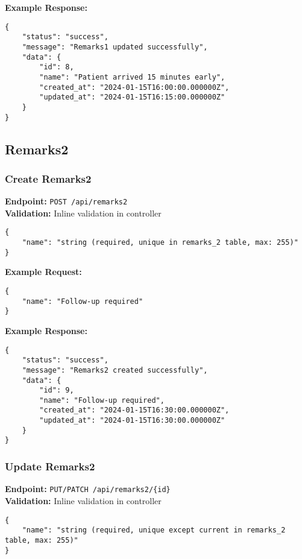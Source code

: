 \documentclass[12pt,a4paper]{article}
\begin{document}
\textbf{Example Response:}
\begin{lstlisting}[caption=Update Remarks1 Example Response]
{
    "status": "success",
    "message": "Remarks1 updated successfully",
    "data": {
        "id": 8,
        "name": "Patient arrived 15 minutes early",
        "created_at": "2024-01-15T16:00:00.000000Z",
        "updated_at": "2024-01-15T16:15:00.000000Z"
    }
}
\end{lstlisting}

\subsection{Remarks2}

\subsubsection{Create Remarks2}
\textbf{Endpoint:} \texttt{POST /api/remarks2}\\
\textbf{Validation:} Inline validation in controller

\begin{lstlisting}[caption=Create Remarks2 Request Body]
{
    "name": "string (required, unique in remarks_2 table, max: 255)"
}
\end{lstlisting}

\textbf{Example Request:}
\begin{lstlisting}[caption=Create Remarks2 Example Request]
{
    "name": "Follow-up required"
}
\end{lstlisting}

\textbf{Example Response:}
\begin{lstlisting}[caption=Create Remarks2 Example Response]
{
    "status": "success",
    "message": "Remarks2 created successfully",
    "data": {
        "id": 9,
        "name": "Follow-up required",
        "created_at": "2024-01-15T16:30:00.000000Z",
        "updated_at": "2024-01-15T16:30:00.000000Z"
    }
}
\end{lstlisting}

\subsubsection{Update Remarks2}
\textbf{Endpoint:} \texttt{PUT/PATCH /api/remarks2/\{id\}}\\
\textbf{Validation:} Inline validation in controller

\begin{lstlisting}[caption=Update Remarks2 Request Body]
{
    "name": "string (required, unique except current in remarks_2 table, max: 255)"
}
\end{lstlisting}
\end{document}
